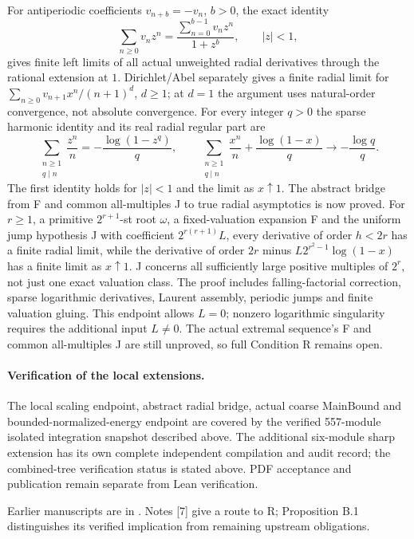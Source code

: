 \documentclass[11pt]{article}
\begin{document}
For antiperiodic coefficients $v_{n+b}=-v_n$, $b>0$, the exact identity
\[
 \sum_{n\ge0}v_nz^n=\frac{\sum_{n=0}^{b-1}v_nz^n}{1+z^b},\qquad |z|<1,
\]
gives finite left limits of all actual unweighted radial derivatives through the rational extension at $1$. Dirichlet/Abel separately gives a finite radial limit for $\sum_{n\ge0}v_{n+1}x^n/(n+1)^d$, $d\ge1$; at $d=1$ the argument uses natural-order convergence, not absolute convergence. For every integer $q>0$ the sparse harmonic identity and its real radial regular part are
\[
 \sum_{\substack{n\ge1\\q\mid n}}\frac{z^n}{n}=-\frac{\log(1-z^q)}q,\qquad
 \sum_{\substack{n\ge1\\q\mid n}}\frac{x^n}{n}+\frac{\log(1-x)}q
 \longrightarrow-\frac{\log q}q.
\]
The first identity holds for $|z|<1$ and the limit as $x\uparrow1$. The abstract bridge from F and common all-multiples J to true radial asymptotics is now proved. For $r\ge1$, a primitive $2^{r+1}$-st root $\omega$, a fixed-valuation expansion F and the uniform jump hypothesis J with coefficient $2^{r(r+1)}L$, every derivative of order $h<2r$ has a finite radial limit, while the derivative of order $2r$ minus $L2^{r^2-1}\log(1-x)$ has a finite limit as $x\uparrow1$. J concerns all sufficiently large positive multiples of $2^r$, not just one exact valuation class. The proof includes falling-factorial correction, sparse logarithmic derivatives, Laurent assembly, periodic jumps and finite valuation gluing. This endpoint allows $L=0$; nonzero logarithmic singularity requires the additional input $L\ne0$. The actual extremal sequence's F and common all-multiples J are still unproved, so full Condition R remains open.


\paragraph{Verification of the local extensions.} The local scaling endpoint, abstract radial bridge, actual coarse MainBound and bounded-normalized-energy endpoint are covered by the verified 557-module isolated integration snapshot described above. The additional six-module sharp extension has its own complete independent compilation and audit record; the combined-tree verification status is stated above. PDF acceptance and publication remain separate from Lean verification.

Earlier manuscripts are in . Notes [7] give a route to R; Proposition B.1 distinguishes its verified implication from remaining upstream obligations.
\end{document}
